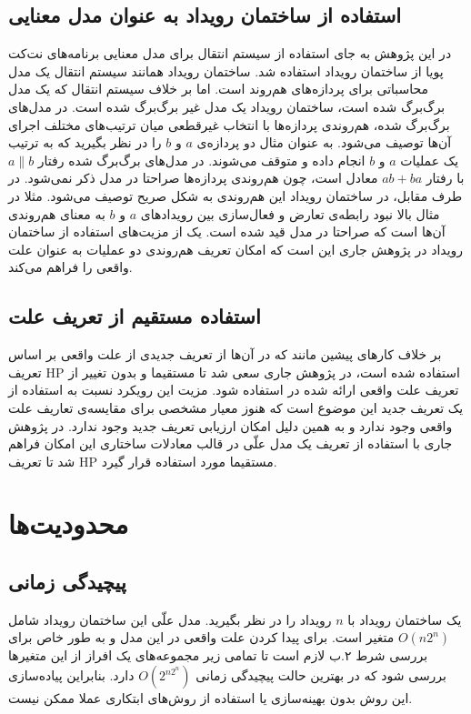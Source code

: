  \subsection{استفاده از ساختمان رویداد به عنوان مدل معنایی}
در این پژوهش به جای استفاده از سیستم انتقال برای مدل معنایی برنامه‌های نت‌کت پویا از ساختمان رویداد استفاده شد.
ساختمان رویداد همانند سیستم انتقال یک مدل محاسباتی برای پردازه‌های هم‌روند است. 
اما بر خلاف سیستم انتقال که یک مدل برگ‌برگ شده است، ساختمان رویداد یک مدل غیر برگ‌برگ شده است.
در مدل‌های برگ‌برگ‌ شده، هم‌روندی پردازه‌ها با انتخاب غیرقطعی میان ترتیب‌های مختلف اجرای آن‌ها توصیف می‌شود.
به عنوان مثال دو پردازه‌ی 
$a$
و
$b$
را در نظر بگیرید که به ترتیب یک عملیات 
$a$
و
$b$
انجام داده و متوقف می‌شوند.
در مدل‌های برگ‌برگ‌ شده رفتار 
$a\parallel b$
با رفتار 
$ab + ba$
معادل است، چون هم‌روندی پردازه‌ها صراحتا در مدل ذکر نمی‌شود.
در طرف مقابل، در ساختمان رویداد این هم‌روندی به شکل صریح توصیف می‌شود.
مثلا در مثال بالا نبود رابطه‌ی تعارض و فعال‌سازی بین رویداد‌های 
$a$
و
$b$
به معنای هم‌روندی آن‌ها است که صراحتا در مدل قید شده است.
یک از مزیت‌های استفاده از ساختمان رویداد در پژوهش جاری این است که امکان تعریف هم‌روندی دو عملیات به عنوان علت واقعی را فراهم می‌کند.


 \subsection{استفاده مستقیم از تعریف علت}
بر خلاف کار‌های پیشین مانند
\cite{decomposing,causality-checking,Caltais-LTL,causal-hml}
که در آن‌ها از تعریف جدیدی از علت واقعی بر اساس تعریف 
HP
استفاده شده است، در پژوهش جاری سعی شد تا مستقیما و بدون تغییر از تعریف علت واقعی ارائه شده در 
\cite{hp}
استفاده شود.
مزیت این رویکرد نسبت به استفاده از یک تعریف جدید این موضوع است که هنوز معیار مشخصی برای مقایسه‌ی تعاریف علت واقعی وجود ندارد و به همین دلیل امکان ارزیابی تعریف جدید وجود ندارد.
در پژوهش جاری با استفاده از تعریف یک مدل علّی در قالب معادلات ساختاری این امکان فراهم شد تا تعریف 
HP
مستقیما مورد استفاده قرار گیرد.

\section{محدودیت‌ها}
\subsection{پیچیدگی زمانی}
یک ساختمان رویداد با 
$n$
رویداد را در نظر بگیرید.
مدل علّی این ساختمان رویداد شامل 
$O(n2^n)$
متغیر است.
برای پیدا کردن علت واقعی در این مدل و به طور خاص برای بررسی شرط ۲.ب لازم است تا تمامی زیر مجموعه‌های یک افراز از این متغیر‌ها بررسی شود که در بهترین حالت پیچیدگی زمانی
$O(2^{n2^n})$
دارد.
بنابراین پیاده‌سازی این روش بدون بهینه‌سازی یا استفاده از روش‌های ابتکاری عملا ممکن نیست.
